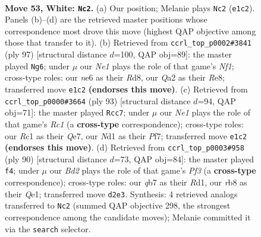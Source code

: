 \documentclass[11pt]{article}
\begin{document}
\clearpage

\begin{figure}[p]\centering
\begin{subfigure}{0.46\textwidth}\centering
\resizebox{\linewidth}{!}{%
\newchessgame
\chessboard[
  setfen={nr6/1q2br1k/p3n3/P1p2p1p/3p1Pp1/1P4P1/QR1BP2P/2RNN1K1 w - - 22 53},
  showmover=false,
  pgfstyle=straightmove, color=movearrow, markmove={e1-c2}
]}
\caption{}
\end{subfigure}\hfill
\begin{subfigure}{0.46\textwidth}\centering
\resizebox{\linewidth}{!}{%
\newchessgame
\chessboard[
  setfen={3rrn1k/2q2bp1/2p1pb1p/1pP2p2/3P1P2/PB2RNPP/1B3QR1/7K b - - 18 49},
  showmover=false,
  pgfstyle=straightmove, color=movearrow, markmove={f8-g6}
]}
\caption{}
\end{subfigure}
\\[4pt]
\begin{subfigure}{0.46\textwidth}\centering
\resizebox{\linewidth}{!}{%
\newchessgame
\chessboard[
  setfen={2r3k1/3rqp2/1pbpn1p1/7p/1PP1Pp1P/1BQR1N2/5PP1/4R1K1 b - - 24 47},
  showmover=false,
  pgfstyle=straightmove, color=movearrow, markmove={c8-c7}
]}
\caption{}
\end{subfigure}\hfill
\begin{subfigure}{0.46\textwidth}\centering
\resizebox{\linewidth}{!}{%
\newchessgame
\chessboard[
  setfen={q1r1n1k1/3r1pb1/6p1/p1npp2p/P6B/1PP2P1P/2B1N1P1/3RQR1K w - - 0 46},
  showmover=false,
  pgfstyle=straightmove, color=movearrow, markmove={f3-f4}
]}
\caption{}
\end{subfigure}
\caption{\textbf{Move 53, White: \texttt{Nc2}.} (a) Our position; Melanie plays \texttt{Nc2} (\texttt{e1c2}). Panels (b)--(d) are the retrieved master positions whose correspondence most drove this move (highest QAP objective among those that transfer to it). (b) Retrieved from \texttt{ccrl\_top\_p0002\#3841} (ply 97) [structural distance $d$=100, QAP obj=89]: the master played \texttt{Ng6}; under $\mu$ our \emph{Ne1} plays the role of that game's \emph{Nf1}; cross-type roles: our \emph{n}e6 as their \emph{R}d8, our \emph{Q}a2 as their \emph{R}e8; transferred move \texttt{e1c2} \textbf{(endorses this move)}. (c) Retrieved from \texttt{ccrl\_top\_p0000\#3664} (ply 93) [structural distance $d$=94, QAP obj=71]: the master played \texttt{Rcc7}; under $\mu$ our \emph{Ne1} plays the role of that game's \emph{Rc1} (a \textbf{cross-type} correspondence); cross-type roles: our \emph{R}c1 as their \emph{Q}e7, our \emph{N}d1 as their \emph{P}f7; transferred move \texttt{e1c2} \textbf{(endorses this move)}. (d) Retrieved from \texttt{ccrl\_top\_p0003\#958} (ply 90) [structural distance $d$=73, QAP obj=84]: the master played \texttt{f4}; under $\mu$ our \emph{Bd2} plays the role of that game's \emph{Pf3} (a \textbf{cross-type} correspondence); cross-type roles: our \emph{q}b7 as their \emph{R}d1, our \emph{r}b8 as their \emph{Q}e1; transferred move \texttt{d2e3}. Synthesis: 4 retrieved analogs transferred to \texttt{Nc2} (summed QAP objective 298, the strongest correspondence among the candidate moves); Melanie committed it via the \texttt{search} selector.}
\label{fig:thought-m104}
\end{figure}
\end{document}
